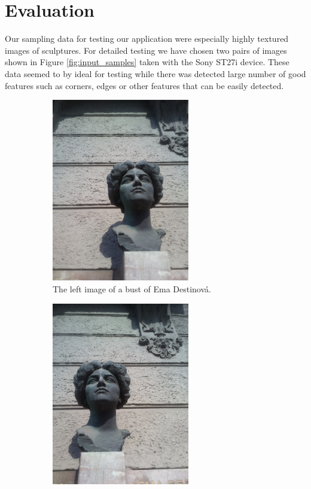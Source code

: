\chapter{Evaluation}
\label{chap:eval}

Our sampling data for testing our application were especially highly textured images of sculptures.
For detailed testing we have chosen two pairs of images shown in Figure \ref{fig:input_samples} taken with the Sony  ST27i device.
These data seemed to by ideal for testing while there was detected large number of good features such as corners, edges or other features that can be easily detected.

\begin{figure}[H]
\centering

\begin{subfigure}[b]{0.45\textwidth}
\centering
\includegraphics[width=6.0cm]{img/ema_a.png}
\caption{The left image of a bust of Ema Destinová.} \label{0}
\end{subfigure}
\begin{subfigure}[b]{0.45\textwidth}
\centering
\includegraphics[width=6.0cm]{img/ema_b.png}

\end{subfigure}
\end{figure}
